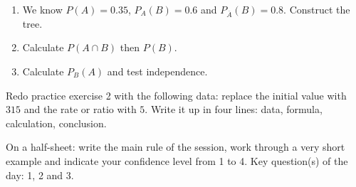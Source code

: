 \begin{exercice}[-- essential]
\begin{enumerate}\item We know $P(A)=0.35$, $P_A(B)=0.6$ and $P_{\overline A}(B)=0.8$. Construct the tree.\item Calculate $P(A\cap B)$ then $P(B)$.\item Calculate $P_B(A)$ and test independence.\end{enumerate}
\end{exercice}


\begin{dm}Redo practice exercise 2 with the following data: replace the initial value with $315$ and the rate or ratio with $5$. Write it up in four lines: data, formula, calculation, conclusion.\end{dm}

\begin{sortie}On a half-sheet: write the main rule of the session, work through a very short example and indicate your confidence level from 1 to 4. Key question(s) of the day: 1, 2 and 3.\end{sortie}

